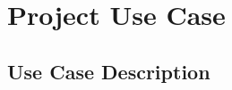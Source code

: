 \chapter{Project Use Case}
\label{chapter:chapter4}

\section{Use Case Description}
\label{sub-sec:chapter4-section1}


